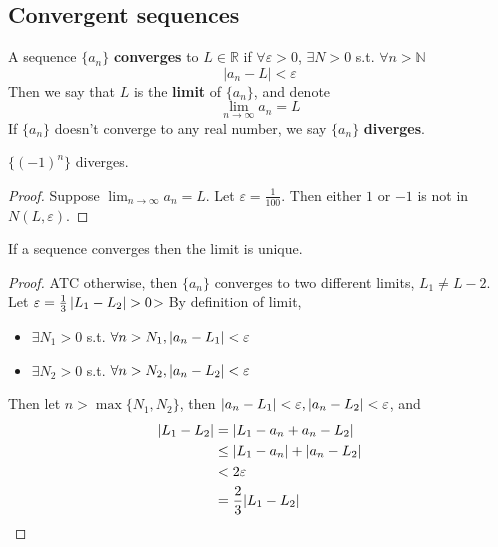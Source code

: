 \subsection{Convergent sequences}

\begin{definition}[Convergence]
    A sequence $\{ a_n \} $ \textbf{converges}
    to $L \in \mathbb{R}$ if $\forall \varepsilon > 0$, 
    $\exists N > 0$ s.t. $\forall n > \mathbb{N}$
    \[
        |a_n - L | < \varepsilon
    \]
    Then we say that $L$ is the \textbf{limit} of $\{ a_n \} $, and denote 
    \[
        \lim_{n \to \infty} a_n = L
    \]
    If $\{ a_n \} $ doesn't converge to any real number, we say $ \{ a_n \} $ \textbf{diverges}.
\end{definition}

\begin{example}
    $\{ (-1)^n \} $ diverges.
\end{example}

\begin{proof}
    Suppose $\lim_{n \to \infty}a_n = L$. 
    Let $\varepsilon = \frac{1}{100}$. 
    Then either $1$ or $-1$ is not in $N(L, \varepsilon)$.
\end{proof}

\begin{theorem}
    If a sequence converges then the limit is unique.
\end{theorem}

\begin{proof}
    ATC otherwise, then $\{ a_n \} $ converges to two different limits,
    $L_1 \neq L-2$. 
    Let $\varepsilon = \frac{1}{3} \left| L_1 - L_2 \right|  > 0$> 
    By definition of limit, 
    \begin{itemize}
        \item $\exists N_1 > 0$ s.t. $\forall n > N_1, |a_n - L_1| < \varepsilon$
        \item $\exists N_2 > 0$ s.t. $\forall n > N_2, |a_n - L_2| < \varepsilon$
    \end{itemize} 
    Then let $n > \max \{ N_1, N_2 \} $, then $|a_n - L_1| < \varepsilon, |a_n - L_2| < \varepsilon$, 
    and 
    \begin{align*}
        |L_1 - L_2| &= |L_1 - a_n + a_n - L_2 |  \\
        & \leq  |L_1 - a_n| + |a_n - L_2| \\
        & < 2 \varepsilon \\
        &= \frac{2}{3} |L_1 - L_2| 
    \end{align*}
\end{proof}

